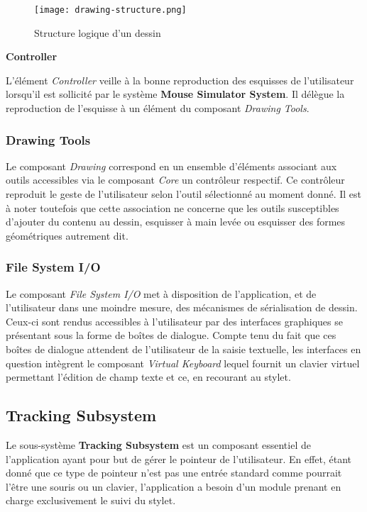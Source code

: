 \documentclass[11pt,a4paper,oldfontcommands]{memoir}
\begin{document}
\begin{figure}[H]
\centering
\texttt{[image: drawing-structure.png]}
\caption{Structure logique d’un dessin}
\end{figure}

\textbf{Controller}

L'élément \textit{Controller} veille à la bonne reproduction des esquisses de l'utilisateur lorsqu'il est sollicité par le système \textbf{Mouse Simulator System}. Il délègue la reproduction de l'esquisse à un élément du composant \textit{Drawing Tools}.

\subsubsection{Drawing Tools}

Le composant \textit{Drawing} correspond en un ensemble d'éléments associant aux outils accessibles via le composant \textit{Core} un contrôleur respectif. Ce contrôleur reproduit le geste de l'utilisateur selon l'outil sélectionné au moment donné. Il est à noter toutefois que cette association ne concerne que les outils susceptibles d'ajouter du contenu au dessin, esquisser à main levée ou esquisser des formes géométriques autrement dit.

\subsubsection{File System I/O}

Le composant \textit{File System I/O} met à disposition de l'application, et de l'utilisateur dans une moindre mesure, des mécanismes de sérialisation de dessin. Ceux-ci sont rendus accessibles à l'utilisateur par des interfaces graphiques se présentant sous la forme de boîtes de dialogue. Compte tenu du fait que ces boîtes de dialogue attendent de l'utilisateur de la saisie textuelle, les interfaces en question intègrent le composant \textit{Virtual Keyboard} lequel fournit un clavier virtuel permettant l'édition de champ texte et ce, en recourant au stylet.

\newpage

\subsection{Tracking Subsystem}

Le sous-système \textbf{Tracking Subsystem} est un composant essentiel de l'application ayant pour but de gérer le pointeur de l'utilisateur. En effet, étant donné que ce type de pointeur n'est pas une entrée standard comme pourrait l'être une souris ou un clavier, l'application a besoin d'un module prenant en charge exclusivement le suivi du stylet.
\end{document}
